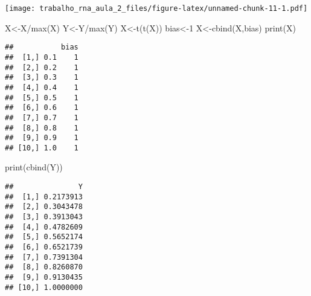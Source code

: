 \documentclass[
]{article}
\newenvironment{Shaded}{\begin{snugshade}}{\end{snugshade}}
\newcommand{\DecValTok}[1]{\textcolor[rgb]{0.00,0.00,0.81}{#1}}
\newcommand{\FunctionTok}[1]{\textcolor[rgb]{0.00,0.00,0.00}{#1}}
\newcommand{\NormalTok}[1]{#1}
\newcommand{\OtherTok}[1]{\textcolor[rgb]{0.56,0.35,0.01}{#1}}
\newcommand{\SpecialCharTok}[1]{\textcolor[rgb]{0.00,0.00,0.00}{#1}}
\begin{document}
\texttt{[image: trabalho\_rna\_aula\_2\_files/figure-latex/unnamed-chunk-11-1.pdf]}

\begin{Shaded}
\begin{Highlighting}[]
\NormalTok{X}\OtherTok{\textless{}{-}}\NormalTok{X}\SpecialCharTok{/}\FunctionTok{max}\NormalTok{(X)}
\NormalTok{Y}\OtherTok{\textless{}{-}}\NormalTok{Y}\SpecialCharTok{/}\FunctionTok{max}\NormalTok{(Y)}
\NormalTok{X}\OtherTok{\textless{}{-}}\FunctionTok{t}\NormalTok{(}\FunctionTok{t}\NormalTok{(X))}
\NormalTok{bias}\OtherTok{\textless{}{-}}\DecValTok{1}
\NormalTok{X}\OtherTok{\textless{}{-}}\FunctionTok{cbind}\NormalTok{(X,bias)}
\FunctionTok{print}\NormalTok{(X)}
\end{Highlighting}
\end{Shaded}

\begin{verbatim}
##           bias
##  [1,] 0.1    1
##  [2,] 0.2    1
##  [3,] 0.3    1
##  [4,] 0.4    1
##  [5,] 0.5    1
##  [6,] 0.6    1
##  [7,] 0.7    1
##  [8,] 0.8    1
##  [9,] 0.9    1
## [10,] 1.0    1
\end{verbatim}

\begin{Shaded}
\begin{Highlighting}[]
\FunctionTok{print}\NormalTok{(}\FunctionTok{cbind}\NormalTok{(Y))}
\end{Highlighting}
\end{Shaded}

\begin{verbatim}
##               Y
##  [1,] 0.2173913
##  [2,] 0.3043478
##  [3,] 0.3913043
##  [4,] 0.4782609
##  [5,] 0.5652174
##  [6,] 0.6521739
##  [7,] 0.7391304
##  [8,] 0.8260870
##  [9,] 0.9130435
## [10,] 1.0000000
\end{verbatim}
\end{document}
